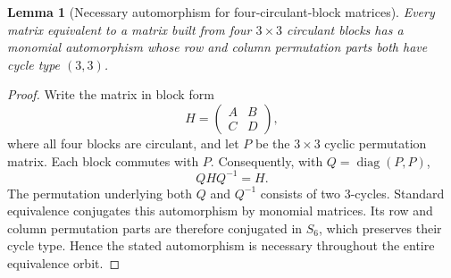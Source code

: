 \documentclass[aps,prx,reprint,nofootinbib,twoside,superscriptaddress,longbibliography,floatfix]{revtex4-2}
\newtheorem{lemma}[theorem]{Lemma}
\theoremstyle{definition}
\begin{document}

\begin{lemma}[Necessary automorphism for four-circulant-block matrices]
\label{lem:supp-dita-automorphism}
Every matrix equivalent to a matrix built from four $3\times3$ circulant blocks has a monomial automorphism whose row and column permutation parts both have cycle type $(3,3)$.
\end{lemma}

\begin{proof}
Write the matrix in block form
\begin{equation}
H=\begin{pmatrix}A&B\\ C&D\end{pmatrix},
\label{eq:supp-four-circulant-block-form}
\end{equation}
where all four blocks are circulant, and let $P$ be the $3\times3$ cyclic permutation matrix.  Each block commutes with $P$.  Consequently, with $Q=\operatorname{diag}(P,P)$,
\begin{equation}
QHQ^{-1}=H.
\label{eq:supp-four-circulant-automorphism}
\end{equation}
The permutation underlying both $Q$ and $Q^{-1}$ consists of two 3-cycles.  Standard equivalence conjugates this automorphism by monomial matrices.  Its row and column permutation parts are therefore conjugated in $S_6$, which preserves their cycle type.  Hence the stated automorphism is necessary throughout the entire equivalence orbit.
\end{proof}

\end{document}
